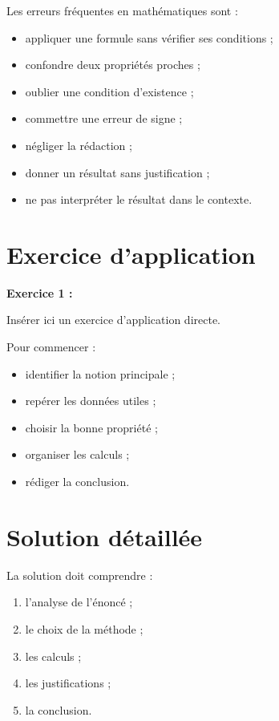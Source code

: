 \documentclass[11pt,a4paper]{article}
\begin{document}
\begin{cadreattention}
Les erreurs fréquentes en mathématiques sont :
\begin{itemize}
    \item appliquer une formule sans vérifier ses conditions ;
    \item confondre deux propriétés proches ;
    \item oublier une condition d’existence ;
    \item commettre une erreur de signe ;
    \item négliger la rédaction ;
    \item donner un résultat sans justification ;
    \item ne pas interpréter le résultat dans le contexte.
\end{itemize}
\end{cadreattention}

\section{Exercice d’application}

\begin{cadreenonce}
\textbf{Exercice 1 :}

Insérer ici un exercice d’application directe.
\end{cadreenonce}

\begin{cadreaide}
Pour commencer :
\begin{itemize}
    \item identifier la notion principale ;
    \item repérer les données utiles ;
    \item choisir la bonne propriété ;
    \item organiser les calculs ;
    \item rédiger la conclusion.
\end{itemize}
\end{cadreaide}

\section{Solution détaillée}

\begin{cadresolution}
La solution doit comprendre :
\begin{enumerate}
    \item l’analyse de l’énoncé ;
    \item le choix de la méthode ;
    \item les calculs ;
    \item les justifications ;
    \item la conclusion.
\end{enumerate}
\end{cadresolution}
\end{document}
